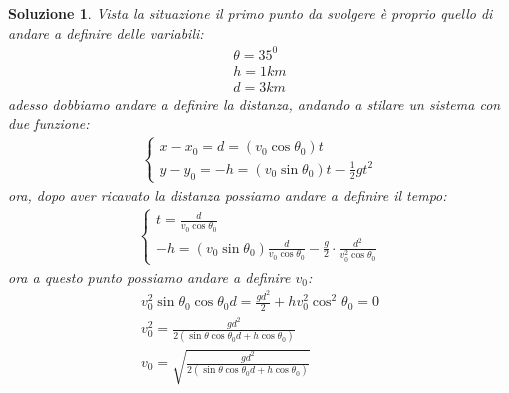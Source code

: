 \documentclass{article}
\newtheorem{sol}{Soluzione}[section]
\begin{document}
\begin{sol}
  Vista la situazione il primo punto da svolgere è proprio quello di andare a definire delle variabili:
  \begin{eqnarray*}
    \theta= 35^0\\
    h=1km\\
    d=3km
  \end{eqnarray*}
  adesso dobbiamo andare a definire la distanza, andando a stilare un sistema con due funzione:
  \begin{eqnarray*}
    \begin{cases}
      x-x_0=d=(v_0\cos\theta_0)t\\
      y-y_0=-h=(v_0\sin\theta_0)t-\frac{1}{2}gt^2
    \end{cases}
  \end{eqnarray*}
  ora, dopo aver ricavato la distanza possiamo andare a definire il tempo:
  \begin{eqnarray*}
    \begin{cases}
      t=\frac{d}{v_0\cos\theta_0}\\
      -h=(v_0\sin\theta_0)\frac{d}{v_0\cos\theta_0}-\frac{g}{2}\cdot \frac{d^2}{v_0^2\cos\theta_0}
    \end{cases}
  \end{eqnarray*}
  ora a questo punto possiamo andare a definire $v_0$:
  \begin{eqnarray*}
    v_0^2\sin\theta_0\cos\theta_0d=\frac{gd^2}{2}+hv_0^2\cos^2\theta_0=0\\
    v_0^2=\frac{gd^2}{2(\sin\theta\cos\theta_0d+h\cos\theta_0)}\\
    v_0=\sqrt{\frac{gd^2}{2(\sin\theta\cos\theta_0d+h\cos\theta_0)}}
  \end{eqnarray*}
\end{sol}
\end{document}
